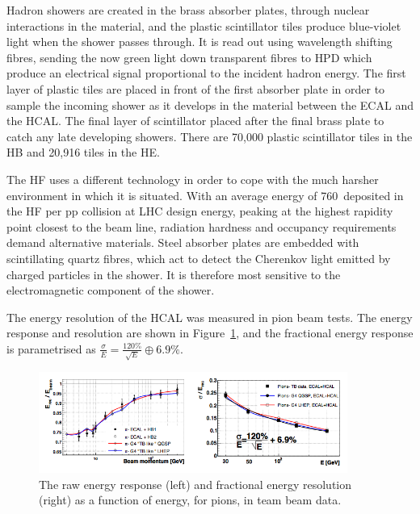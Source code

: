Hadron showers are created in the brass absorber plates, through nuclear interactions in the material, and the plastic scintillator tiles produce blue-violet light when the shower passes through. 
It is read out using wavelength shifting fibres, sending the now green light down transparent fibres to \ac{HPD} which produce an electrical signal proportional to the incident hadron energy.
The first layer of plastic tiles are placed in front of the first absorber plate in order to sample the incoming shower as it develops in the material between the \ac{ECAL} and the \ac{HCAL}.
The final layer of scintillator placed after the final brass plate to catch any late developing showers.
There are 70,000 plastic scintillator tiles in the \ac{HB} and 20,916 tiles in the \ac{HE}.

The \ac{HF} uses a different technology in order to cope with the much harsher environment in which it is situated.
With an average energy of 760~\GeV deposited in the \ac{HF} per pp collision at LHC design energy, peaking at the highest rapidity point closest to the beam line, radiation hardness and occupancy requirements demand alternative materials.
Steel absorber plates are embedded with scintillating quartz fibres, which act to detect the Cherenkov light emitted by charged particles in the shower. 
It is therefore most sensitive to the electromagnetic component of the shower.

The energy resolution of the \ac{HCAL} was measured in pion beam tests. The energy response and 
resolution are shown in Figure~\ref{fig:CMShcalRes}, and the fractional energy response is parametrised
as 
$\frac{\sigma}{E} = \frac{120\%}{\sqrt{E}} \oplus 6.9\%$.

\begin{figure}[htbp]
  \begin{center}
  \includegraphics[width=0.9\textwidth]{Figures/detector/HCALres}
  \caption{The raw energy response (left) and fractional energy resolution (right) as a function of energy, for pions, in team beam data.
}
  \label{fig:CMShcalRes}
  \end{center}
\end{figure}

